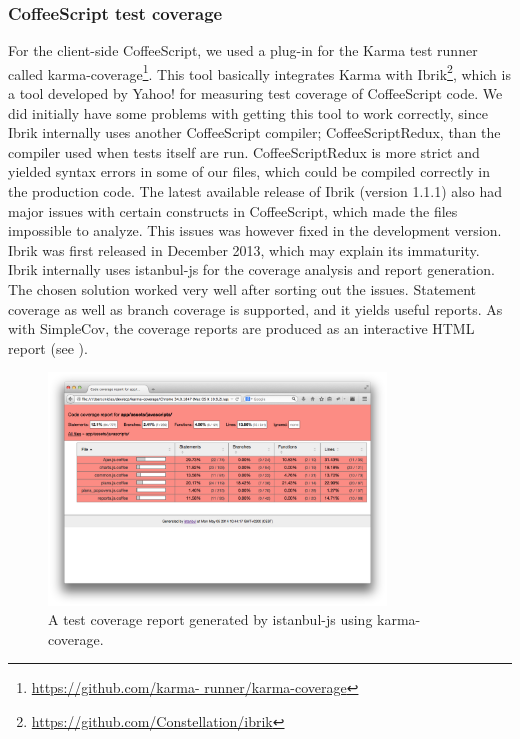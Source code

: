 \subsubsection{CoffeeScript test coverage}
For the client-side CoffeeScript, we used a plug-in for the Karma test
runner called karma-coverage\footnote{\url{https://github.com/karma-
runner/karma-coverage}}. This tool basically integrates Karma with
Ibrik\footnote{\url{https://github.com/Constellation/ibrik}}, which is a
tool developed by Yahoo! for measuring test coverage of CoffeeScript
code. We did initially have some problems with getting this tool to work
correctly, since Ibrik internally uses another CoffeeScript compiler;
CoffeeScriptRedux, than the compiler used when tests itself are run.
CoffeeScriptRedux is more strict and yielded syntax errors in some of
our files, which could be compiled correctly in the production code. The
latest available release of Ibrik (version 1.1.1) also had major issues
with certain constructs in CoffeeScript, which made the files impossible
to analyze. This issues was however fixed in the development version.
Ibrik was first released in December 2013, which may explain its
immaturity. Ibrik internally uses istanbul-js for the coverage
analysis and report generation.\\

The chosen solution worked very well after sorting out the issues.
Statement coverage as well as branch coverage is supported, and it
yields useful reports. As with SimpleCov, the coverage reports are
produced as an interactive HTML report (see ).\\

\begin{figure}
\centering
\includegraphics[width=0.8\textwidth]{results/choices/karma_coverage}
\caption{A test coverage report generated by istanbul-js using karma-coverage.}
\label{fig:karma_report}
\end{figure}


